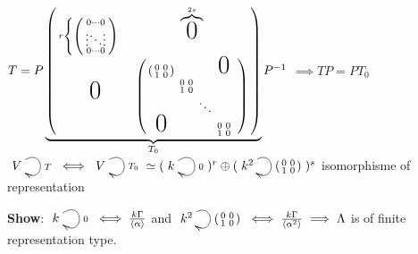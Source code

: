 \begin{exam}
$ T = P \underbrace{ \left(\begin{smallmatrix} r\begin{cases} \left(\begin{smallmatrix} 0 \cdots 0  \\\vdots \ddots \vdots \\0 \cdots 0 \end{smallmatrix}\right) \end{cases} & \overbrace{\text{\huge0}}^{2s}\\\text{\huge0} & 
\left(\begin{smallmatrix}  
\left( \begin{smallmatrix} 0 & 0\\ 1 & 0\\ \end{smallmatrix}\right) & & & \text{\huge0}  \\
& \begin{smallmatrix} 0 & 0\\ 1 & 0\\ \end{smallmatrix} & & \\
& &\ddots &  & \\
\text{\huge0} & & &\begin{smallmatrix} 0 & 0\\ 1 & 0\\ \end{smallmatrix} \\
\end{smallmatrix}\right) \end{smallmatrix}\right)}_{T_0}P^{-1} $ $\implies TP= PT_0$ \nolinebreak[4]\\\newline
$\xymatrix{V \ar@(ur,dr)^{T}} \iff \xymatrix{V \ar@(ur,dr)^{T_0}} \simeq (\xymatrix{k \ar@(ur,dr)^{0}})^r \oplus (\xymatrix{k^2 \ar@(ur,dr)^{\left(\begin{smallmatrix}0&0\\1&0\end{smallmatrix}\right)}})^s  $  isomorphisme of representation

\textbf{Show}: $\xymatrix{k \ar@(ur,dr)^{0}} \iff \frac{k\G}{\langle\alpha\rangle}$ and $\xymatrix{k^2 \ar@(ur,dr)^{\left(\begin{smallmatrix}0&0\\1&0\end{smallmatrix}\right)}} \iff \frac{k\G}{\langle\alpha^2\rangle} \implies \Lambda$ is of finite representation type.
\end{exam}
